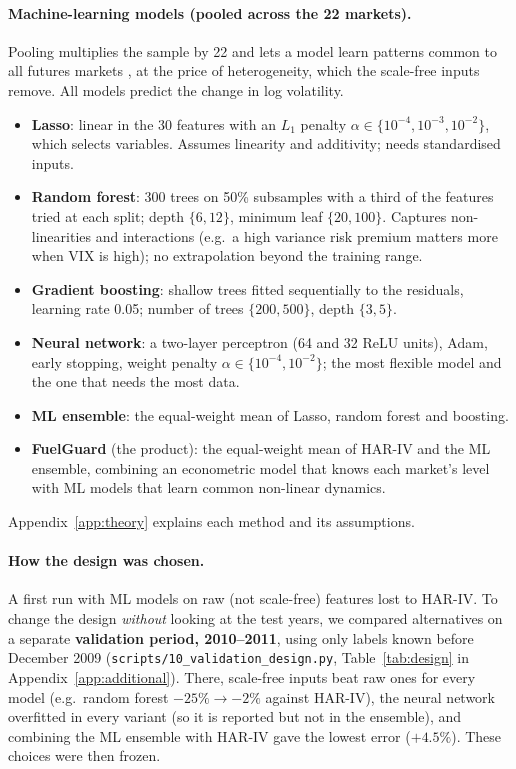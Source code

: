 \paragraph{Machine-learning models (pooled across the 22 markets).} Pooling multiplies the sample by 22
and lets a model learn patterns common to all futures markets \citep{gu2020}, at the price of
heterogeneity, which the scale-free inputs remove. All models predict the change in log volatility.
\begin{itemize}
\item \textbf{Lasso}: linear in the 30 features with an $L_1$ penalty $\alpha\in\{10^{-4},10^{-3},10^{-2}\}$,
which selects variables. Assumes linearity and additivity; needs standardised inputs.
\item \textbf{Random forest}: 300 trees on 50\% subsamples with a third of the features tried at each split;
depth $\{6,12\}$, minimum leaf $\{20,100\}$. Captures non-linearities and interactions (e.g.\ a high variance
risk premium matters more when VIX is high); no extrapolation beyond the training range.
\item \textbf{Gradient boosting}: shallow trees fitted sequentially to the residuals, learning rate 0.05;
number of trees $\{200,500\}$, depth $\{3,5\}$.
\item \textbf{Neural network}: a two-layer perceptron (64 and 32 ReLU units), Adam, early stopping, weight
penalty $\alpha\in\{10^{-4},10^{-2}\}$; the most flexible model and the one that needs the most data.
\item \textbf{ML ensemble}: the equal-weight mean of Lasso, random forest and boosting.
\item \textbf{FuelGuard} (the product): the equal-weight mean of HAR-IV and the ML ensemble, combining an
econometric model that knows each market's level with ML models that learn common non-linear dynamics.
\end{itemize}
Appendix~\ref{app:theory} explains each method and its assumptions.

\paragraph{How the design was chosen.} A first run with ML models on raw (not scale-free) features lost to
HAR-IV. To change the design \emph{without} looking at the test years, we compared alternatives on a separate
\textbf{validation period, 2010--2011}, using only labels known before December 2009
(\texttt{scripts/10\_validation\_design.py}, Table~\ref{tab:design} in Appendix~\ref{app:additional}). There,
scale-free inputs beat raw ones for every model (e.g.\ random forest $-25\%\to-2\%$ against HAR-IV), the
neural network overfitted in every variant (so it is reported but not in the ensemble), and combining the ML
ensemble with HAR-IV gave the lowest error ($+4.5\%$). These choices were then frozen.
